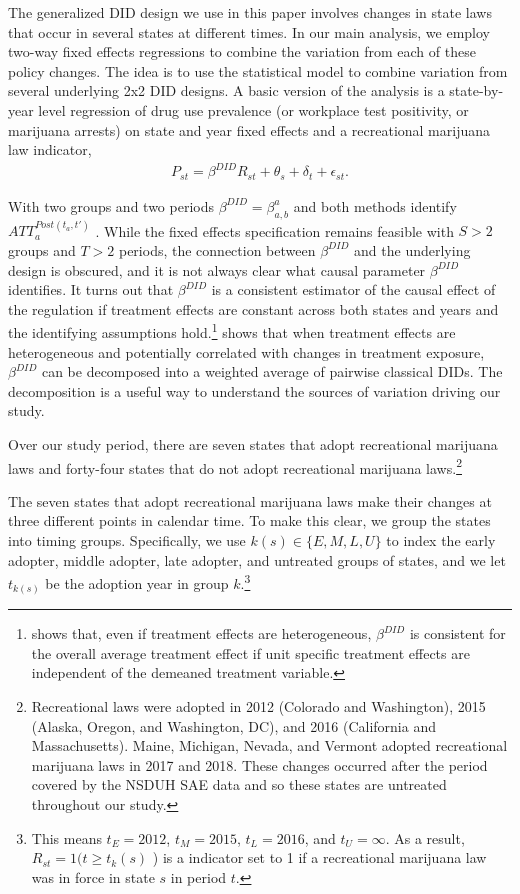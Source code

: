 \documentclass[12pt]{article}%
\begin{document}
The generalized DID design we use in this paper involves changes in state laws that occur in several states at different times. In our main analysis, we employ two-way fixed effects regressions to combine the variation from each of these policy changes. The idea is to use the statistical model to combine variation from several underlying 2x2 DID designs. A basic version of the analysis is a state-by-year level regression of drug use prevalence (or workplace test positivity, or marijuana arrests) on state and year fixed effects and a recreational marijuana law indicator,
%
\vspace{-.25cm}
\begin{align*}
P_{st} = \beta^{DID} R_{st}+ \theta_s + \delta_t + \epsilon_{st}.
\end{align*}

With two groups and two periods $\beta^{DID} = \beta_{a,b}^a$ and both methods identify $ATT_a^{Post(t_a,t' )}$ . While the fixed effects specification remains feasible with $S>2$ groups and $T>2$ periods, the connection between $\beta^{DID}$ and the underlying design is obscured, and it is not always clear what causal parameter $\beta^{DID}$ identifies. It turns out that $\beta^{DID}$ is a consistent estimator of the causal effect of the regulation if treatment effects are constant across both states and years and the identifying assumptions hold.\footnote{\cite{Wooldridge2005} shows that, even if treatment effects are heterogeneous, $\beta^{DID}$ is consistent for the overall average treatment effect if unit specific treatment effects are independent of the demeaned treatment variable.} \cite{Goodman-Bacon2018} shows that when treatment effects are heterogeneous and potentially correlated with changes in treatment exposure, $\beta^{DID}$ can be decomposed into a weighted average of pairwise classical DIDs. The decomposition is a useful way to understand the sources of variation driving our study. 

Over our study period, there are seven states that adopt recreational marijuana laws and forty-four states that do not adopt recreational marijuana laws.\footnote{Recreational laws were adopted in 2012 (Colorado and Washington), 2015 (Alaska, Oregon, and Washington, DC), and 2016 (California and Massachusetts). Maine, Michigan, Nevada, and Vermont adopted recreational marijuana laws in 2017 and 2018. These changes occurred after the period covered by the NSDUH SAE data and so these states are untreated throughout our study.}

The seven states that adopt recreational marijuana laws make their changes at three different points in calendar time. To make this clear, we group the states into timing groups. Specifically, we use  $k(s)\in\{E,M,L,U\}$ to index the early adopter, middle adopter, late adopter, and untreated groups of states, and we let $t_{k(s)}$  be the adoption year in group $k$.\footnote{This means $t_E=2012$, $t_M=2015$, $t_L=2016$, and $t_U=\infty$. As a result, $R_{st}=1(t\geq t_k(s)$ ) is a indicator set to 1 if a recreational marijuana law was in force in state $s$ in period $t$.}
\end{document}
